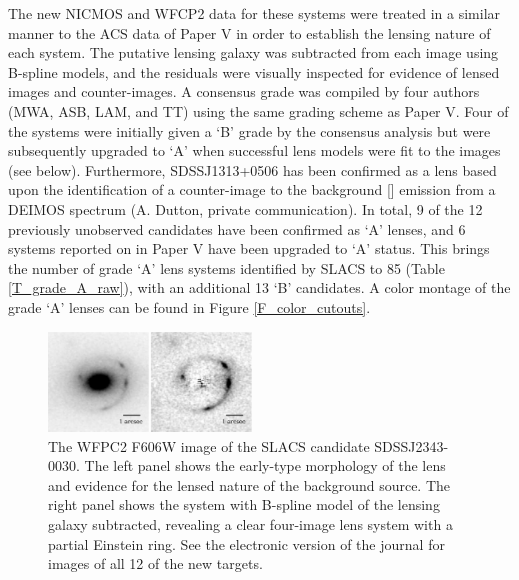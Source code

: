 \documentclass[iop]{emulateapj}
\begin{document}
The new NICMOS and WFCP2 data for these systems were treated in a similar manner to the ACS data of Paper V in order to establish the lensing nature of each system. The putative lensing galaxy was subtracted from each image using B-spline models, and the residuals were visually inspected for evidence of lensed images and counter-images. A consensus grade was compiled by four authors (MWA, ASB, LAM, and TT) using the same grading scheme as Paper V. Four of the systems were initially given a `B' grade by the consensus analysis but were subsequently upgraded to `A' when successful lens models were fit to the images (see below). Furthermore, SDSSJ1313+0506 has been confirmed as a lens based upon the identification of a counter-image to the background [] emission from a DEIMOS spectrum (A. Dutton, private communication). In total, 9 of the 12 previously unobserved candidates have been confirmed as `A' lenses, and 6 systems reported on in Paper V have been upgraded to `A' status. This brings the number of grade `A' lens systems identified by SLACS to 85 (Table \ref{T_grade_A_raw}), with an additional 13 `B' candidates. A color montage of the grade `A' lenses can be found in Figure \ref{F_color_cutouts}.

\begin{figure}[ht]
 \centering
 \includegraphics[width=0.48\textwidth,clip]{f1l.eps}
 \caption{The WFPC2 F606W image of the SLACS candidate SDSSJ2343-0030. The left panel shows the early-type morphology of the lens and evidence for the lensed nature of the background source. The right panel shows the system with B-spline model of the lensing galaxy subtracted, revealing a clear four-image lens system with a partial Einstein ring. See the electronic version of the journal for images of all 12 of the new targets.}
 \label{F_new_targets}
\end{figure}
\end{document}
